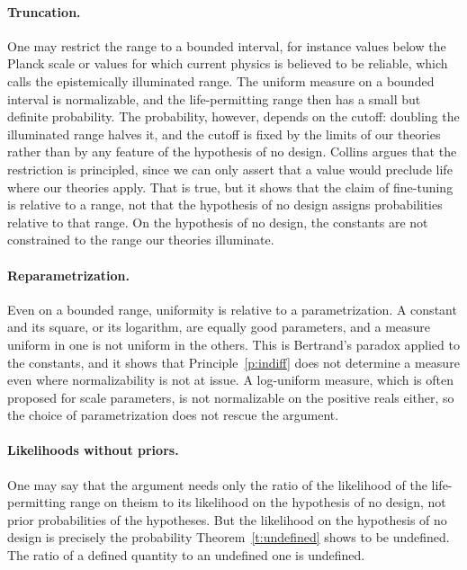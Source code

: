 \documentclass{situationist-preprint}
\begin{document}
\paragraph{Truncation.} One may restrict the range to a bounded interval, for instance values below the Planck scale or values for which current physics is believed to be reliable, which \citet{Collins2009} calls the epistemically illuminated range. The uniform measure on a bounded interval is normalizable, and the life-permitting range then has a small but definite probability. The probability, however, depends on the cutoff: doubling the illuminated range halves it, and the cutoff is fixed by the limits of our theories rather than by any feature of the hypothesis of no design. Collins argues that the restriction is principled, since we can only assert that a value would preclude life where our theories apply. That is true, but it shows that the claim of fine-tuning is relative to a range, not that the hypothesis of no design assigns probabilities relative to that range. On the hypothesis of no design, the constants are not constrained to the range our theories illuminate.

\paragraph{Reparametrization.} Even on a bounded range, uniformity is relative to a parametrization. A constant and its square, or its logarithm, are equally good parameters, and a measure uniform in one is not uniform in the others. This is Bertrand's paradox applied to the constants, and it shows that Principle~\ref{p:indiff} does not determine a measure even where normalizability is not at issue. A log-uniform measure, which is often proposed for scale parameters, is not normalizable on the positive reals either, so the choice of parametrization does not rescue the argument.

\paragraph{Likelihoods without priors.} One may say that the argument needs only the ratio of the likelihood of the life-permitting range on theism to its likelihood on the hypothesis of no design, not prior probabilities of the hypotheses. But the likelihood on the hypothesis of no design is precisely the probability Theorem~\ref{t:undefined} shows to be undefined. The ratio of a defined quantity to an undefined one is undefined.
\end{document}
